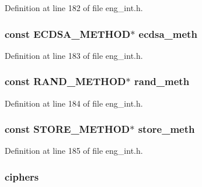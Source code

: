 Definition at line 182 of file eng\+\_\+int.\+h.

\subsubsection[{\texorpdfstring{ecdsa\+\_\+meth}{ecdsa_meth}}]{\setlength{\rightskip}{0pt plus 5cm}const {\bf E\+C\+D\+S\+A\+\_\+\+M\+E\+T\+H\+OD}$\ast$ ecdsa\+\_\+meth}\hypertarget{structengine__st_af29b4fdb92b1208e748fd1aa403bd039}{}\label{structengine__st_af29b4fdb92b1208e748fd1aa403bd039}


Definition at line 183 of file eng\+\_\+int.\+h.

\subsubsection[{\texorpdfstring{rand\+\_\+meth}{rand_meth}}]{\setlength{\rightskip}{0pt plus 5cm}const {\bf R\+A\+N\+D\+\_\+\+M\+E\+T\+H\+OD}$\ast$ rand\+\_\+meth}\hypertarget{structengine__st_acb9ee109a1e24a1c316dd577c3ac8654}{}\label{structengine__st_acb9ee109a1e24a1c316dd577c3ac8654}


Definition at line 184 of file eng\+\_\+int.\+h.

\subsubsection[{\texorpdfstring{store\+\_\+meth}{store_meth}}]{\setlength{\rightskip}{0pt plus 5cm}const {\bf S\+T\+O\+R\+E\+\_\+\+M\+E\+T\+H\+OD}$\ast$ store\+\_\+meth}\hypertarget{structengine__st_ab359c37df518f475f4533ec4d0a155b8}{}\label{structengine__st_ab359c37df518f475f4533ec4d0a155b8}


Definition at line 185 of file eng\+\_\+int.\+h.

\subsubsection[{\texorpdfstring{ciphers}{ciphers}}]{ ciphers}\hypertarget{structengine__st_a508e643702b942199faab017f2f8a206}{}\label{structengine__st_a508e643702b942199faab017f2f8a206}


